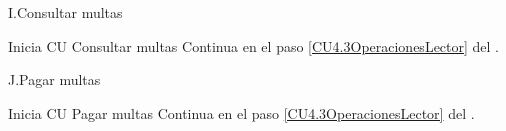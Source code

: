 		\begin{UCtrayectoriaA}{I.}{Consultar multas}

			\UCpaso Inicia CU Consultar multas
			\UCpaso Continua en el paso \ref{CU4.3OperacionesLector} del .

		\end{UCtrayectoriaA}

		\begin{UCtrayectoriaA}{J.}{Pagar multas}

			\UCpaso Inicia CU Pagar multas
			\UCpaso Continua en el paso \ref{CU4.3OperacionesLector} del .

		\end{UCtrayectoriaA}


